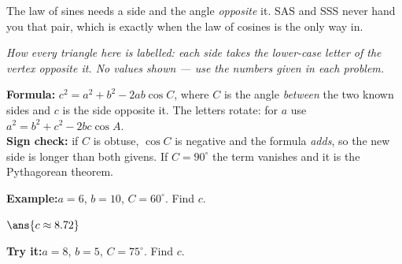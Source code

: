 \documentclass[12pt]{article}
\begin{document}

\noindent\small The law of sines needs a side and the angle \emph{opposite} it.
SAS and SSS never hand you that pair, which is exactly when the law of cosines
is the only way in.\normalsize

\begin{center}
\end{center}
\vspace{-0.15cm}
\noindent\footnotesize\emph{How every triangle here is labelled: each side takes
the lower-case letter of the vertex opposite it. No values shown --- use the
numbers given in each problem.}\normalsize

\begin{formulabox}
\textbf{Formula:} $c^{2} = a^{2} + b^{2} - 2ab\cos C$, where $C$ is the angle
\emph{between} the two known sides and $c$ is the side opposite it. The letters
rotate: for $a$ use $a^{2} = b^{2} + c^{2} - 2bc\cos A$.\\[3pt]
\textbf{Sign check:} if $C$ is obtuse, $\cos C$ is negative and the formula
\emph{adds}, so the new side is longer than both givens. If $C = 90^\circ$ the
term vanishes and it is the Pythagorean theorem.
\end{formulabox}
\begin{examplebox}
\textbf{Example:}\quad $a = 6$, $b = 10$, $C = 60^\circ$. Find $c$.

$\ans{c \approx 8.72}$
\end{examplebox}
\begin{tryitbox}
\textbf{Try it:}\quad $a = 8$, $b = 5$, $C = 75^\circ$. Find $c$.\\[2pt]
\end{tryitbox}
\end{document}
